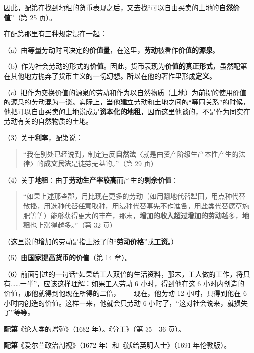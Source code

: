 因此，配第在找到地租的货币表现之后，又去找“可以自由买卖的土地的\textbf{自然价值}”（第 25 页）。

在配第那里有三种规定混在一起：

（a）由等量劳动时间决定的\textbf{价值量}，在这里，\textbf{劳动}被看作\textbf{价值的源泉}。

（b）作为社会劳动的形式的\textbf{价值}。因此，货币表现为\textbf{价值的真正形式}，虽然配第在其他地方抛弃了货币主义的一切幻想。所以在他的著作里形成\textbf{定义}。

（c）把作为交换价值的源泉的劳动和作为以自然物质（土地）为前提的使用价值的源泉的劳动混为一谈。实际上，当他建立劳动和土地之间的“等同关系”的时候，他把可以自由买卖的土地说成是\textbf{资本化的地租}，因而这里他谈的，不是作为同实在劳动有关的自然物质的土地。

（3）关于\textbf{利率}，配第说：

\begin{quote}“我在别处已经说到，制定违反\textbf{自然法}〈就是由资产阶级生产本性产生的法律〉的\textbf{成文民法}是徒劳无益的。”（第 29 页）\end{quote}

（4）关于\textbf{地租}：由于\textbf{劳动生产率较高}而产生的\textbf{剩余价值}：

\begin{quote}“如果上述那些郡，用比现在更多的劳动（如用翻地代替犁田，用点种代替散播，用选种代替任意取种，用浸种代替事先不作准备，用盐类代替腐草施肥等等）能够获得更大的丰产，那末，\textbf{增加的收入超过增加的劳动}越多，\textbf{地租}也上涨得越多。”（第 32 页）\end{quote}

（这里说的增加的劳动是指上涨了的“\textbf{劳动价格}”或\textbf{工资}。）

（5）\textbf{由国家提高货币的价值}（第 14 章）。

（6）前面引过的一句话“如果给工人双倍的生活资料，那末，工人做的工作，将只有……一半”，应该这样理解：如果工人劳动 6 小时，得到他在这 6 小时内创造的价值，那他就得到他现在所得的二倍，——现在，他劳动 12 小时，只得到他在 6 小时内创造的价值。这样一来，他就会只劳动 6 小时了，“这对社会说来，就损失了”等等。


\textbf{配第}《论人类的增殖》（1682 年）。《分工》（第 35—36 页）。


\textbf{配第}《爱尔兰政治剖视》（1672 年）和《献给英明人士》（1691 年伦敦版）。

